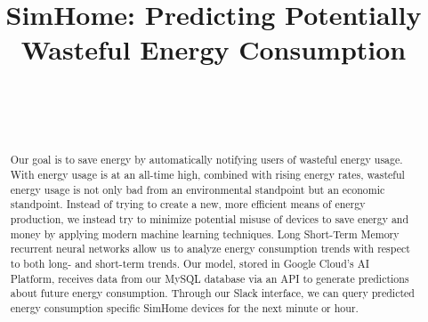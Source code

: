 \documentclass[conference]{IEEEtran}
\begin{document}
\title{SimHome: Predicting Potentially Wasteful Energy Consumption}


\author{
 \\

\and
{}
 \\ %

\and
{}
}
\maketitle


\begin{abstract}
Our goal is to save energy by automatically notifying users of wasteful energy usage. With energy usage is at an all-time high, combined with rising energy rates, wasteful energy usage is not only bad from an environmental standpoint but an economic standpoint. Instead of trying to create a new, more efficient means of energy production, we instead try to minimize potential misuse of devices to save energy and money by applying modern machine learning techniques. Long Short-Term Memory recurrent neural networks allow us to analyze energy consumption trends with respect to both long- and short-term trends. Our model, stored in Google Cloud's AI Platform, receives data from our MySQL database via an API to generate predictions about future energy consumption. Through our Slack interface, we can query predicted energy consumption specific SimHome devices for the next minute or hour.
\end{abstract}
\end{document}
